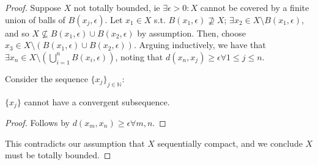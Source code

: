 \begin{proof}
    Suppose $X$ not totally bounded, ie $\exists \epsilon > 0 : X$ cannot be covered by a finite union of balls of $B(x_j, \epsilon)$. Let $x_1 \in X$ s.t. $B(x_1, \epsilon) \nsupseteq X$; $\exists x_2 \in X \setminus B(x_1, \epsilon)$, and so $X \nsubseteq B(x_1, \epsilon) \cup B(x_2, \epsilon)$ by assumption. Then, choose $x_3 \in X \setminus (B(x_1, \epsilon) \cup B(x_2, \epsilon))$. Arguing inductively, we have that $\exists x_n \in X \setminus (\bigcup_{i=1}^{n} B(x_i, \epsilon))$, noting that $d(x_n, x_j) \geq \epsilon \forall 1 \leq j \leq n$.

    Consider the sequence $\{x_{j}\}_{j \in \mathbb{N}}$:
    \begin{lemma-inline}
        $\{x_{j}\}$ cannot have a convergent subsequence.
    \end{lemma-inline}
    \begin{proof}
        Follows by $d(x_m, x_n) \geq \epsilon \forall m, n$.
    \end{proof}
    This contradicts our assumption that $X$ sequentially compact, and we conclude $X$ must be totally bounded.
\end{proof}
